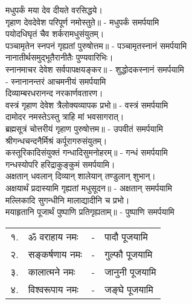 मधुपर्कं मया देव दीयते वरसिद्धये।\\
गृहाण देवदेवेश परिपूर्ण नमोस्तुते॥ - मधुपर्कं समर्पयामि\\

पयोदधिघृतं चैव शर्करामधुसंयुतम्।\\
पञ्चामृतेन स्नपनं गृह्यतां पुरुषोत्तम॥ - पञ्चामृतस्नानं समर्पयामि\\

नानातीर्थसमुद्भूतैरानीतैः पुण्यवारिभिः। \\
स्नानमाचर देवेश सर्वपापक्षयङ्कर॥ - शुद्धोदकस्नानं समर्पयामि\\
- स्नानानन्तरं आचमनीयं समर्पयामि\\

दिव्याम्बरधरानन्द नरकार्णवतारण।\\
वस्त्रं गृहाण देवेश त्रैलोक्यव्यापक प्रभो॥ - वस्त्रं समर्पयामि\\

दामोदर नमस्तेऽस्तु त्राहि मां भवसागरात्।\\
ब्रह्मसूत्रं चोत्तरीयं गृहाण पुरुषोत्तम॥ - उपवीतं समर्पयामि\\

श्रीगन्धचन्दनैर्मिश्रं कर्पूरागरुसंयुतम्। \\
कस्तूरिकादिसंयुक्तं गन्धादिसुमनोहरम्॥ - गन्धं समर्पयामि\\
गन्धस्योपरि हरिद्राकुङ्कुमं समर्पयामि।\\

अक्षतान् धवलान् दिव्यान् शालेयान् तण्डुलान् शुभान्।\\
अक्षयार्थं प्रदास्यामि गृह्यतां मधुसूदन॥ - अक्षतान् समर्पयामि\\

मल्लिकादि सुगन्धीनि मालाद्यादीनि च प्रभो। \\
मयाहृतानि पूजार्थं पुष्पाणि प्रतिगृह्यताम्॥ - पुष्पाणि समर्पयामि

\begin{tabular}{llll}
१.&	ॐ वराहाय नमः &-& पादौ पूजयामि	\\
२.&	सङ्कर्षणाय नमः &-& गुल्फौ पूजयामि\\
३.&	कालात्मने नमः &-& जानुनी पूजयामि	\\
४.&	विश्वरूपाय नमः &-& जङ्घे पूजयामि\\
\end{tabular}

